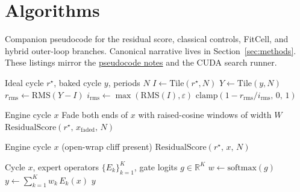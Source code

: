 \section{Algorithms}
\label{app:algorithms}

Companion pseudocode for the residual score, classical controls, FitCell, and hybrid outer-loop branches.
Canonical narrative lives in Section~\ref{sec:methods}. These listings mirror
the \href{https://github.com/reeldemo/denoise-opt-meta/blob/master/docs/PSEUDOCODE.md}{pseudocode notes} and the CUDA search runner.

\begin{algorithm}[t]
\caption{ResidualScore}
\label{alg:residual}
\begin{algorithmic}[1]
\Require Ideal cycle $r^{\star}$, baked cycle $y$, periods $N$
\State $I \gets \mathrm{Tile}(r^{\star}, N)$
\State $Y \gets \mathrm{Tile}(y, N)$
\State $r_{\mathrm{rms}} \gets \mathrm{RMS}(Y-I)$
\State $i_{\mathrm{rms}} \gets \max(\mathrm{RMS}(I), \varepsilon)$
\State \Return $\mathrm{clamp}(1 - r_{\mathrm{rms}}/i_{\mathrm{rms}},\,0,\,1)$
\end{algorithmic}
\end{algorithm}

\begin{algorithm}[t]
\caption{DualCosine baseline}
\label{alg:dualcosine}
\begin{algorithmic}[1]
\Require Engine cycle $x$
\State Fade both ends of $x$ with raised-cosine windows of width $W$
\State \Return $\mathrm{ResidualScore}(r^{\star},\,x_{\mathrm{faded}},\,N)$
\end{algorithmic}
\end{algorithm}

\begin{algorithm}[t]
\caption{No-bake (passthrough) control}
\label{alg:no-bake}
\begin{algorithmic}[1]
\Require Engine cycle $x$ (open-wrap cliff present)
\State \Return $\mathrm{ResidualScore}(r^{\star},\,x,\,N)$ 
\end{algorithmic}
\end{algorithm}

\begin{algorithm}[t]
\caption{MoE soft gating over bake experts}
\label{alg:moe}
\begin{algorithmic}[1]
\Require Cycle $x$, expert operators $\{E_k\}_{k=1}^{K}$, gate logits $g\in\mathbb{R}^{K}$
\State $w \gets \mathrm{softmax}(g)$
\State $y \gets \sum_{k=1}^{K} w_k\, E_k(x)$
\State \Return $y$
\end{algorithmic}
\end{algorithm}

